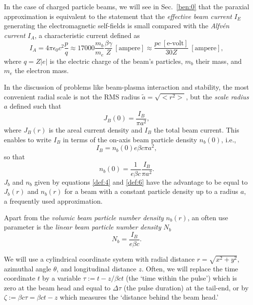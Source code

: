 \documentclass [12pt,a4paper,     ]{report} %
\newcommand{\DEF}{:=}                 %
\begin{document}
	In the case of charged particle beams, we will see in Sec.~\ref{ben:0} that the paraxial approximation is equivalent to the statement that the \emph{effective beam current} $I_E$ generating the electromagnetic self-fields is small compared with the \emph{Alfv\'en current} $I_A$, a characteristic current defined as \cite{ALFVE1939-, MCCOR1982-}
%
\begin{equation}\label{def:3} %
	I_A = 4\pi \epsilon_0 c^2 \frac{p}{q}
           \approx 17000\frac{m_b}{m_e}\frac{\beta\gamma}{Z} ~ [\text{ampere}]
  \approx  \frac{pc~[\text{e-volt}]}{30 Z} ~ [\text{ampere}],
\end{equation}
%
where $q = Z |e|$ is the electric charge of the beam's particles, $m_b$ their mass, and $m_e$ the electron mass.


   In the discussion of problems like beam-plasma interaction and stability, the most convenient radial scale is not the RMS radius $\tilde{a} = \sqrt{<r^2>}$, but the \emph{scale radius} $a$ defined such that
%
\begin{equation}\label{def:4} %
	J_B(0) = \frac{I_B}{\pi a^2},
\end{equation}
%
where $J_B(r)$ is the areal current density and $I_B$ the total beam current.  This enables to write $I_B$ in terms of the on-axis beam particle density $n_b(0)$, i.e.,
%
\begin{equation}\label{def:5} %
	I_B = n_b(0) e \beta c \pi a^2,
\end{equation}
%
so that
%
\begin{equation}\label{def:6} %
    n_b(0) = \frac{1}{e\beta c} \frac{I_B}{\pi a^2}.
\end{equation}
%
   $J_b$ and $n_b$ given by equations \eqref{def:4} and \eqref{def:6} have the advantage to be equal to $J_b(r)$ and $n_b(r)$ for a beam with a constant particle density up to a radius $a$, a frequently used approximation.

   Apart from the \emph{volumic beam particle number density} $n_b(r)$, an often use parameter is the \emph{linear beam particle number density} $N_b$
%
\begin{equation}\label{def:6-1} %
	N_b= \frac{I_B}{e\beta c}.
\end{equation}
%

   We will use a cylindrical coordinate system with radial distance $r=\sqrt{x^2+y^2}$, azimuthal angle $\theta$, and longitudinal distance $z$.  Often, we will replace the time coordinate $t$ by a variable $\tau \DEF t - z/\beta ct$ (the `time within the pulse') which is zero at the beam head and equal to $\Delta \tau$ (the pulse duration) at the tail-end, or by $\zeta \DEF \beta c \tau = \beta c t - z$ which measures the `distance behind the beam head.'
\end{document}

